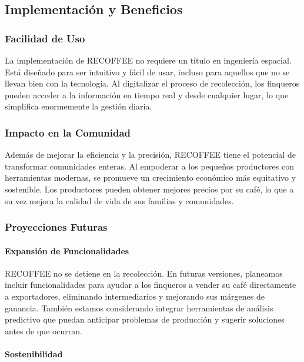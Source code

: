 \documentclass[12pt]{article}
\begin{document}
\subsection{Implementación y Beneficios}

\subsubsection{Facilidad de Uso}

La implementación de RECOFFEE no requiere un título en ingeniería espacial. Está diseñado para ser intuitivo y fácil de usar, incluso para aquellos que no se llevan bien con la tecnología. Al digitalizar el proceso de recolección, los finqueros pueden acceder a la información en tiempo real y desde cualquier lugar, lo que simplifica enormemente la gestión diaria.

\subsubsection{Impacto en la Comunidad}

Además de mejorar la eficiencia y la precisión, RECOFFEE tiene el potencial de transformar comunidades enteras. Al empoderar a los pequeños productores con herramientas modernas, se promueve un crecimiento económico más equitativo y sostenible. Los productores pueden obtener mejores precios por su café, lo que a su vez mejora la calidad de vida de sus familias y comunidades.

\subsubsection{Proyecciones Futuras}

\paragraph{Expansión de Funcionalidades}

RECOFFEE no se detiene en la recolección. En futuras versiones, planeamos incluir funcionalidades para ayudar a los finqueros a vender su café directamente a exportadores, eliminando intermediarios y mejorando sus márgenes de ganancia. También estamos considerando integrar herramientas de análisis predictivo que puedan anticipar problemas de producción y sugerir soluciones antes de que ocurran.

\paragraph{Sostenibilidad}
\end{document}
